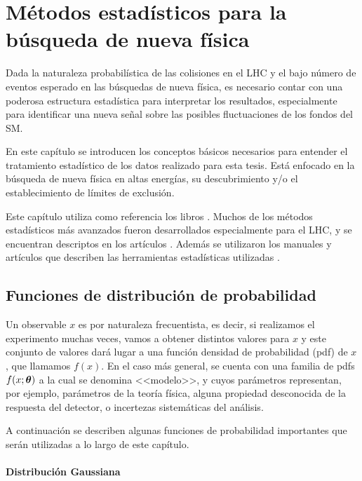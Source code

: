 \chapter{Métodos estadísticos para la búsqueda de nueva física}
\label{cap:estadistica}

Dada la naturaleza probabilística de las colisiones en el LHC y el bajo número
de eventos esperado en las búsquedas de nueva física, es necesario contar con
una poderosa estructura estadística para interpretar los resultados, especialmente
para identificar una nueva señal sobre las posibles fluctuaciones de los fondos
del SM.

En este capítulo se introducen los conceptos básicos necesarios para entender el
tratamiento estadístico de los datos realizado para esta tesis. Está enfocado en
la búsqueda de nueva física en altas energías, su descubrimiento y/o el
establecimiento de límites de exclusión.

Este capítulo utiliza como referencia los libros \cite{Cowan,James}. Muchos de
los métodos estadísticos más avanzados fueron desarrollados especialmente para
el LHC, y se encuentran descriptos en los artículos
\cite{AsymAprox,ReadCLs,medsigNote,Cranmer:2015nia}. Además se utilizaron los
manuales y artículos que describen las herramientas estadísticas utilizadas
\cite{Cranmer:1456844,HistFitter}.


\section{Funciones de distribución de probabilidad}

Un observable $x$ es por naturaleza frecuentista, es decir, si realizamos
el experimento muchas veces, vamos a obtener distintos valores para $x$ y este
conjunto de valores dará lugar a una función densidad de probabilidad (pdf)
de $x$, que llamamos $f(x)$. En el caso más general, se cuenta con una familia
de pdfs $f(x;\bm{\theta})$ a la cual se denomina <<modelo>>, y cuyos parámetros
representan, por ejemplo, parámetros de la teoría física, alguna
propiedad desconocida de la respuesta del detector, o incertezas sistemáticas
del análisis.

A continuación se describen algunas funciones de probabilidad importantes que
serán utilizadas a lo largo de este capítulo.

\subsubsection{Distribución Gaussiana}

